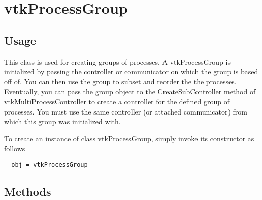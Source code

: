 \section{vtkProcessGroup}

\subsection{Usage}


 This class is used for creating groups of processes.  A vtkProcessGroup is
 initialized by passing the controller or communicator on which the group is
 based off of.  You can then use the group to subset and reorder the the
 processes.  Eventually, you can pass the group object to the
 CreateSubController method of vtkMultiProcessController to create a
 controller for the defined group of processes.  You must use the same
 controller (or attached communicator) from which this group was initialized
 with.


To create an instance of class vtkProcessGroup, simply
invoke its constructor as follows
\begin{verbatim}
  obj = vtkProcessGroup
\end{verbatim}
\subsection{Methods}


